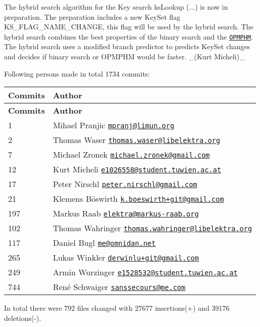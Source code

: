 \begin{DoxyItemize}
\item The hybrid search algorithm for the Key search {\ttfamily ks\+Lookup (...)} is now in preparation. The preparation includes a new Key\+Set flag {\ttfamily K\+S\+\_\+\+F\+L\+A\+G\+\_\+\+N\+A\+M\+E\+\_\+\+C\+H\+A\+N\+GE}, this flag will be used by the hybrid search. The hybrid search combines the best properties of the binary search and the \href{https://master.libelektra.org/doc/dev/data-structures.md#order-preserving-minimal-perfect-hash-map-aka-opmphm}{\tt O\+P\+M\+P\+HM}. The hybrid search uses a modified branch predictor to predicts Key\+Set changes and decides if binary search or O\+P\+M\+P\+HM would be faster. \+\_\+(\+Kurt Micheli)\+\_\+
\end{DoxyItemize}

Following persons made in total 1734 commits\+:

\tabulinesep=1mm
\begin{longtabu} spread 0pt [c]{*{2}{|X[-1]}|}
\hline
\rowcolor{\tableheadbgcolor}\textbf{ Commits }&\textbf{ Author  }\\
\endfirsthead
\hline
\endfoot
\hline
\rowcolor{\tableheadbgcolor}\textbf{ Commits }&\textbf{ Author  }\\
 &Mihael Pranjic \href{mailto:mpranj@limun.org}{\tt mpranj@limun.\+org} \\
2 &Thomas Waser \href{mailto:thomas.waser@libelektra.org}{\tt thomas.\+waser@libelektra.\+org} \\
7 &Michael Zronek \href{mailto:michael.zronek@gmail.com}{\tt michael.\+zronek@gmail.\+com} \\
12 &Kurt Micheli \href{mailto:e1026558@student.tuwien.ac.at}{\tt e1026558@student.\+tuwien.\+ac.\+at} \\
17 &Peter Nirschl \href{mailto:peter.nirschl@gmail.com}{\tt peter.\+nirschl@gmail.\+com} \\
21 &Klemens Böswirth \href{mailto:k.boeswirth+git@gmail.com}{\tt k.\+boeswirth+git@gmail.\+com} \\
197 &Markus Raab \href{mailto:elektra@markus-raab.org}{\tt elektra@markus-\/raab.\+org} \\
102 &Thomas Wahringer \href{mailto:thomas.wahringer@libelektra.org}{\tt thomas.\+wahringer@libelektra.\+org} \\
117 &Daniel Bugl \href{mailto:me@omnidan.net}{\tt me@omnidan.\+net} \\
265 &Lukas Winkler \href{mailto:derwinlu+git@gmail.com}{\tt derwinlu+git@gmail.\+com} \\
249 &Armin Wurzinger \href{mailto:e1528532@student.tuwien.ac.at}{\tt e1528532@student.\+tuwien.\+ac.\+at} \\
744 &René Schwaiger \href{mailto:sanssecours@me.com}{\tt sanssecours@me.\+com} \\
\end{longtabu}
In total there were 792 files changed with 27677 insertions(+) and 39176 deletions(-\/).

